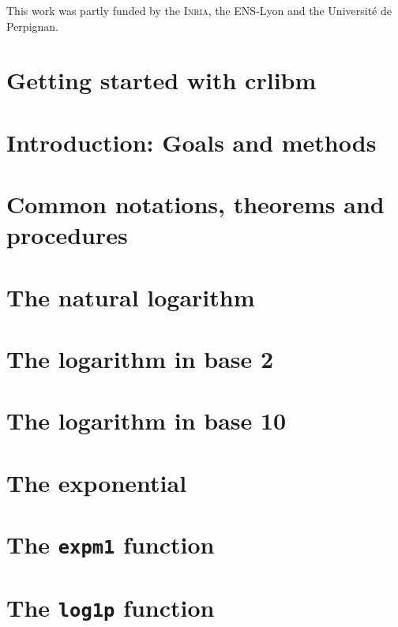 \documentclass[a4paper]{book}
\begin{document}
This work was partly funded by the \textsc{Inria}, the ENS-Lyon and
the Universit\'e de Perpignan.

\tableofcontents

\addtocounter{chapter}{-1}
\chapter{Getting started with crlibm}


\chapter{Introduction: Goals and methods \label{chap:intro}}


\chapter{Common notations, theorems and procedures \label{chap:common}}


\chapter{The natural logarithm \label{chap:log}}


\chapter{The logarithm in base 2 \label{chap:log2}}


\chapter{The logarithm in base 10 \label{chap:log10}}

 
\chapter{The exponential \label{chap:exp}}


\chapter{The \texttt{expm1} function\label{chap:expm1}}


\chapter{The \texttt{log1p} function\label{chap:log1p}}

\end{document}
